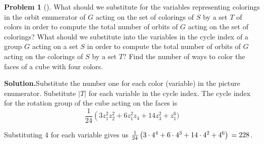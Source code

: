 \documentclass[10pt,]{book}
\theoremstyle{plain}
\theoremstyle{definition}
\newtheorem{activity}[project]{Problem}
\theoremstyle{definition}
\numberwithin{equation}{chapter}
\begin{document}
\begin{activity}[]\label{activity-323}
What should we substitute for the variables representing colorings in the orbit enumerator of \(G\) acting on the set of colorings of \(S\) by a set \(T\) of colors in order to compute the total number of orbits of \(G\) acting on the set of colorings? What should we substitute into the variables in the cycle index of a group \(G\) acting on a set \(S\) in order to compute the total number of orbits of \(G\) acting on the colorings of \(S\) by a set \(T\)? Find the number of ways to color the faces of a cube with four colors.%
\par\medskip\noindent%
\textbf{Solution.}\quad Substitute the number one for each color (variable) in the picture enumerator. Substitute \(|T|\) for each variable in the cycle index. The cycle index for the rotation group of the cube acting on the faces is%
\begin{equation*}
\frac{1}{24}\left(3z_1^2z_2^2+ 6z_1^2z_4 +14z_3^2+z_1^6\right.)
\end{equation*}
%
\par
Substituting 4 for each variable gives us \(\frac{1}{24}\left(3\cdot4^4+6\cdot4^3+14\cdot 4^2+4^6\right)\\=228\).%
\end{activity}
\end{document}
